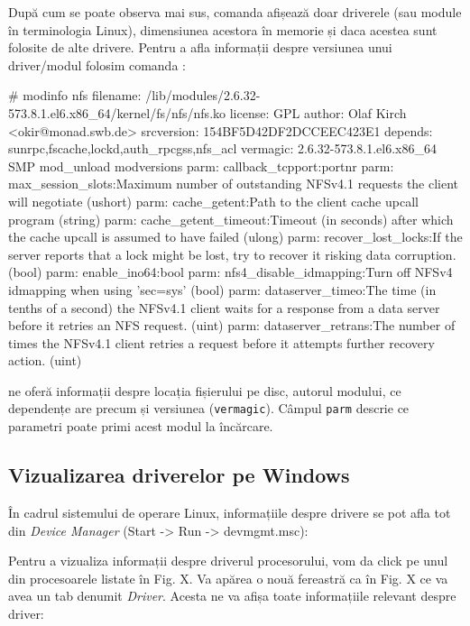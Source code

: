 După cum se poate observa mai sus, comanda  afișează doar driverele (sau
module în terminologia Linux), dimensiunea acestora în memorie și daca acestea
sunt folosite de alte drivere. Pentru a afla informații despre versiunea unui
driver/modul folosim comanda :

\begin{screen}
# modinfo nfs
filename:       /lib/modules/2.6.32-573.8.1.el6.x86_64/kernel/fs/nfs/nfs.ko
license:        GPL
author:         Olaf Kirch <okir@monad.swb.de>
srcversion:     154BF5D42DF2DCCEEC423E1
depends:        sunrpc,fscache,lockd,auth_rpcgss,nfs_acl
vermagic:       2.6.32-573.8.1.el6.x86_64 SMP mod_unload modversions
parm:           callback_tcpport:portnr
parm:           max_session_slots:Maximum number of outstanding NFSv4.1 requests the client will negotiate (ushort)
parm:           cache_getent:Path to the client cache upcall program (string)
parm:           cache_getent_timeout:Timeout (in seconds) after which the cache upcall is assumed to have failed (ulong)
parm:           recover_lost_locks:If the server reports that a lock might be lost, try to recover it risking data corruption. (bool)
parm:           enable_ino64:bool
parm:           nfs4_disable_idmapping:Turn off NFSv4 idmapping when using 'sec=sys' (bool)
parm:           dataserver_timeo:The time (in tenths of a second) the NFSv4.1  client  waits for a response from a  data server before it retries an NFS request. (uint)
parm:           dataserver_retrans:The  number of times the NFSv4.1 client retries a request before it attempts further  recovery  action. (uint)
\end{screen}

 ne oferă informații despre locația fișierului pe disc, autorul
modului, ce dependențe are precum și versiunea (\texttt{vermagic}). Câmpul
\texttt{parm} descrie ce parametri poate primi acest modul la încărcare.

\subsection{Vizualizarea driverelor pe Windows}
\label{sec:hardware-virtualizare-windows}

În cadrul sistemului de operare Linux, informațiile despre drivere se pot afla
tot din \textit{Device Manager} (Start -> Run -> devmgmt.msc):

Pentru a vizualiza informații despre driverul procesorului, vom da click pe unul
din procesoarele listate în Fig. X. Va apărea o nouă fereastră ca în Fig. X ce
va avea un tab denumit \textit{Driver}. Acesta ne va afișa toate informațiile relevant
despre driver:


